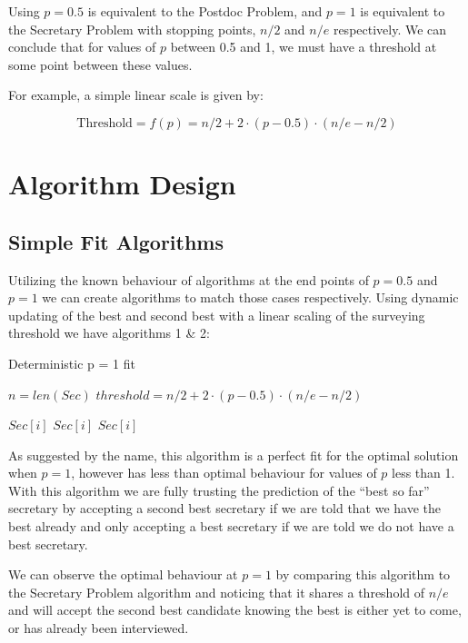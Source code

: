 \documentclass[a4paper,11pt]{article}
\begin{document}
Using $p = 0.5$ is equivalent to the Postdoc Problem, and $p = 1 $ is equivalent to the Secretary Problem with stopping points, $n/2$ and $n/e$ respectively. We can conclude that for values of $p$ between 0.5 and 1, we must have a threshold at some point between these values.

For example, a simple linear scale is given by:

$$
\text{Threshold} = f(p) = n/2 + 2 \cdot (p-0.5) \cdot (n/e - n/2)
$$

\section{Algorithm Design}
\label{sec:design}
\subsection{Simple Fit Algorithms}

Utilizing the known behaviour of algorithms at the end points of $p = 0.5$ and $p = 1$ we can create algorithms to match those cases respectively. Using dynamic updating of the best and second best with a linear scaling of the surveying threshold we have algorithms 1 \& 2: \\

\begin{algorithm}[H]
\caption{Deterministic p = 1 fit}
\begin{algorithmic}[1]

\State $n = len(Sec)$
\State $threshold = n/2 + 2 \cdot (p-0.5) \cdot (n/e - n/2)$

            \State \Return $Sec[i]$
            \State \Return $Sec[i]$
        \EndIf
    \EndFor
    \State \Return $Sec[i]$
\EndProcedure
\end{algorithmic}
\end{algorithm} 


As suggested by the name, this algorithm is a perfect fit for the optimal solution when $p = 1$, however has less than optimal behaviour for values of $p$ less than 1. With this algorithm we are fully trusting the prediction of the ``best so far'' secretary by accepting a second best secretary if we are told that we have the best already and only accepting a best secretary if we are told we do not have a best secretary.

We can observe the optimal behaviour at $p = 1 $ by comparing this algorithm to the Secretary Problem algorithm and noticing that it shares a threshold of $n/e$ and will accept the second best candidate knowing the best is either yet to come, or has already been interviewed.
\end{document}
